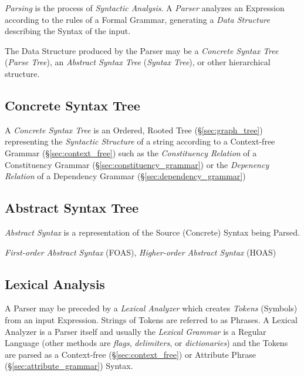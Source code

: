 \emph{Parsing} is the process of \emph{Syntactic Analysis}. A
\emph{Parser} analyzes an Expression according to the rules of a
Formal Grammar, generating a \emph{Data Structure} describing the
Syntax of the input.

The Data Structure produced by the Parser may be a \emph{Concrete
  Syntax Tree} (\emph{Parse Tree}), an \emph{Abstract Syntax Tree}
(\emph{Syntax Tree}), or other hierarchical structure.



\subsection{Concrete Syntax Tree}\label{sec:concrete_syntax}

A \emph{Concrete Syntax Tree} is an Ordered, Rooted Tree
(\S\ref{sec:graph_tree}) representing the \emph{Syntactic
  Structure} of a string according to a Context-free Grammar
(\S\ref{sec:context_free}) such as the \emph{Constituency Relation}
of a Constituency Grammar (\S\ref{sec:constituency_grammar}) or the
\emph{Depenency Relation} of a Dependency Grammar
(\S\ref{sec:dependency_grammar})



\subsection{Abstract Syntax Tree}\label{sec:abstract_syntax}

\emph{Abstract Syntax} is a representation of the Source (Concrete)
Syntax being Parsed.

\emph{First-order Abstract Syntax} (FOAS), \emph{Higher-order Abstract
  Syntax} (HOAS)



\subsection{Lexical Analysis}

A Parser may be preceded by a \emph{Lexical Analyzer} which creates
\emph{Tokens} (Symbols) from an input Expression. Strings of Tokens
are referred to as Phrases. A Lexical Analyzer is a Parser itself and
usually the \emph{Lexical Grammar} is a Regular Language (other
methods are \emph{flags}, \emph{delimiters}, or \emph{dictionaries})
and the Tokens are parsed as a Context-free
(\S\ref{sec:context_free}) or Attribute Phrase
(\S\ref{sec:attribute_grammar}) Syntax.

